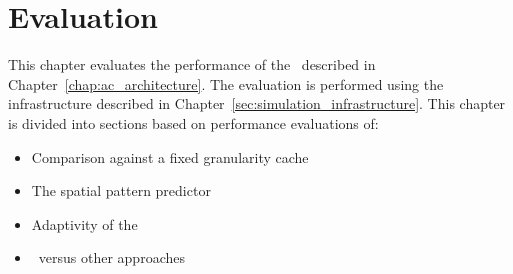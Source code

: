 
%
%

\chapter{Evaluation}
\label{chap:evaluation}
This chapter evaluates the performance of the \AC\ described in Chapter~\ref{chap:ac_architecture}. The evaluation is performed using the infrastructure described in Chapter~\ref{sec:simulation_infrastructure}. This chapter is divided into sections based on performance evaluations of:
\begin{itemize}[noitemsep]
	\item Comparison against a fixed granularity cache
	\item The spatial pattern predictor
	\item Adaptivity of the \AC\
	\item \AC\ versus other approaches
\end{itemize}

